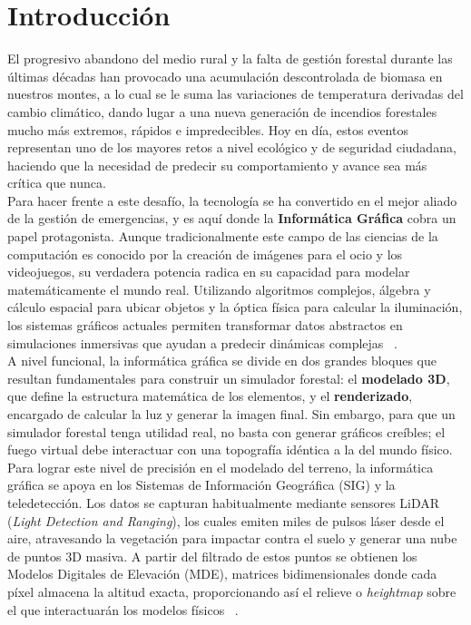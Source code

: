 \chapter{Introducción}
El progresivo abandono del medio rural y la falta de gestión forestal durante las últimas décadas han provocado una acumulación descontrolada de biomasa en nuestros montes, a lo cual se le suma las variaciones de temperatura derivadas del cambio climático, dando lugar a una nueva generación de incendios forestales mucho más extremos, rápidos e impredecibles. Hoy en día, estos eventos representan uno de los mayores retos a nivel ecológico y de seguridad ciudadana, haciendo que la necesidad de predecir su comportamiento y avance sea más crítica que nunca. \\

Para hacer frente a este desafío, la tecnología se ha convertido en el mejor aliado de la gestión de emergencias, y es aquí donde la \textbf{Informática Gráfica} cobra un papel protagonista. Aunque tradicionalmente este campo de las ciencias de la computación es conocido por la creación de imágenes para el ocio y los videojuegos, su verdadera potencia radica en su capacidad para modelar matemáticamente el mundo real. Utilizando algoritmos complejos, álgebra y cálculo espacial para ubicar objetos y la óptica física para calcular la iluminación, los sistemas gráficos actuales permiten transformar datos abstractos en simulaciones inmersivas que ayudan a predecir dinámicas complejas ~\cite{foley2014computer}.\\

A nivel funcional, la informática gráfica se divide en dos grandes bloques que resultan fundamentales para construir un simulador forestal: el \textbf{modelado 3D}, que define la estructura matemática de los elementos, y el \textbf{renderizado}, encargado de calcular la luz y generar la imagen final. Sin embargo, para que un simulador forestal tenga utilidad real, no basta con generar gráficos creíbles; el fuego virtual debe interactuar con una topografía idéntica a la del mundo físico.\\

Para lograr este nivel de precisión en el modelado del terreno, la informática gráfica se apoya en los Sistemas de Información Geográfica (SIG) y la teledetección. Los datos se capturan habitualmente mediante sensores LiDAR (\textit{Light Detection and Ranging}), los cuales emiten miles de pulsos láser desde el aire, atravesando la vegetación para impactar contra el suelo y generar una nube de puntos 3D masiva. A partir del filtrado de estos puntos se obtienen los Modelos Digitales de Elevación (MDE), matrices bidimensionales donde cada píxel almacena la altitud exacta, proporcionando así el relieve o \textit{heightmap} sobre el que interactuarán los modelos físicos ~\cite{qgis_software}\cite{cnig_datos}.\\

